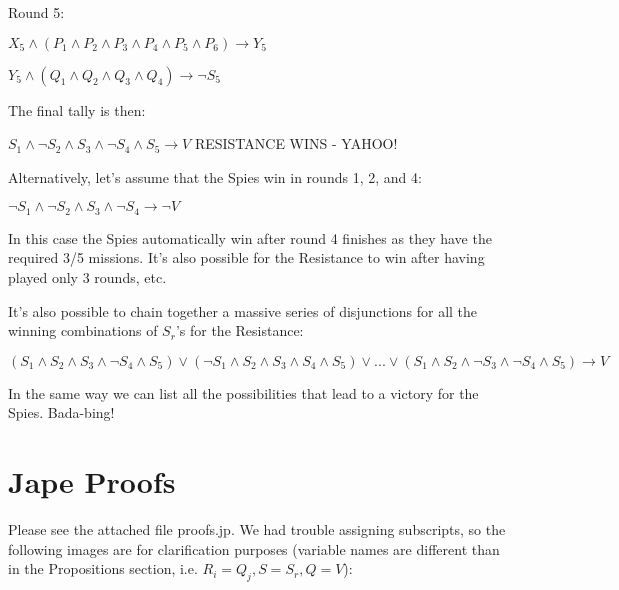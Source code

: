 \documentclass[pdftex,10pt,a4paper]{article}
\numberwithin{equation}{section} %
\begin{document}
Round 5:\newline

$X_5 \land ( P_1 \land P_2 \land P_3 \land P_4 \land P_5 \land P_6) \rightarrow Y_5 $ \newline

$Y_5 \land (Q_1 \land Q_2 \land Q_3 \land Q_4) \rightarrow \neg S_5  $\newline

The final tally is then: \newline

$S_1 \land \neg S_2 \land S_3 \land \neg S_4 \land S_5 \rightarrow V $ \newline \newline \indent RESISTANCE WINS - YAHOO! \newline

Alternatively, let's assume that the Spies win in rounds 1, 2, and 4:\newline

$\neg S_1 \land \neg S_2 \land S_3 \land \neg S_4 \rightarrow \neg V $ \newline

In this case the Spies automatically win after round 4 finishes as they have \indent the required 3/5 missions. It's also possible for the Resistance to win after \indent having played only 3 rounds, etc.\newline

It's also possible to chain together a massive series of disjunctions for all the \indent winning combinations of $S_r$'s for the Resistance:

\begin{equation}
	(S_1 \land S_2 \land S_3 \land \neg S_4 \land S_5) \lor (\neg S_1 \land S_2 \land S_3 \land S_4 \land S_5) \lor ... \lor (S_1 \land S_2 \land \neg S_3 \land \neg S_4 \land S_5) \rightarrow V
\end{equation} \newline

In the same way we can list all the possibilities that lead to a victory for the \indent Spies. Bada-bing!

\section*{Jape Proofs}
Please see the attached file proofs.jp.\newline
We had trouble assigning subscripts, so the following images are for clarification purposes (variable names are different than in the Propositions section, i.e. $R_i=Q_j, S=S_r, Q=V$):\newline
\end{document}
